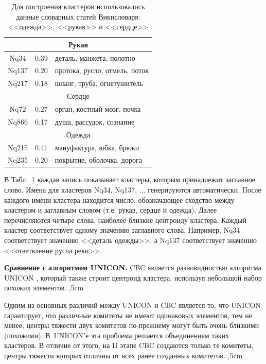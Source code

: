 \documentclass{article}
\begin{document}
\begin{articletext}
\begin{table}[H]
\caption{Для построения кластеров использовались данные словарных статей Викисловаря: <<одежда>>,  <<рукав>> и  <<сердце>>}
\begin{tabular}{|c|c|m{5cm}|}
\hline
\multicolumn{3}{|c|}{Рукав}\\
\hline 
Nq34 & 0.39 & деталь, манжета, полотно\\
Nq137 & 0.20 & протока, русло, отмель, поток\\
Nq217 & 0.18 & шланг, труба, огнетушитель\\
\hline
\multicolumn{3}{|c|}{Сердце}\\
\hline
Nq72 &  0.27 & орган, костный мозг, почка\\
Nq866 & 0.17 & душа, рассудок, сознание\\
\hline
\multicolumn{3}{|c|}{Одежда}\\
\hline
Nq215 & 0.41 & мануфактура, юбка, брюки\\
Nq235 & 0.20 & покрытие, оболочка, дорога\\
\hline
\end{tabular}
\label{yank}
\end{table}

В Табл.~\ref{yank} каждая запись показывает кластеры, которым принадлежит заглавное слово. Имена для кластеров Nq34, Nq137, $\ldots$ генерируются автоматически. После каждого имени кластера находится число, обозначающее сходство между кластером и заглавным словом (т.е. рукав, сердце и одежда). Далее перечисляются четыре слова, наиболее близкие центроиду кластера. Каждый кластер соответствует одному значению заглавного слова. Например, Nq34 соответствует значению <<деталь одежды>>, а Nq137 соответствует значению <<ответвление русла реки>>.


\textbf{Сравнение с алгоритмом UNICON.} CBC является разновидностью алгоритма UNICON \cite{Lin 2001}, который также строит центроид кластера, используя небольшой набор похожих элементов.
,5cm

Одним из основных различий между UNICON и CBC является то, что UNICON гарантирует, что различные комитеты не имеют одинаковых элементов, тем не менее, центры тяжести двух комитетов по-прежнему могут быть очень близкими (похожими). В~UNICON'е эта проблема решается объединением таких кластеров. В отличие от этого, на II этапе CBC создаются только те комитеты, центры тяжести которых отличны от всех ранее созданных комитетов.
,5cm


\end{articletext}
\end{document}
